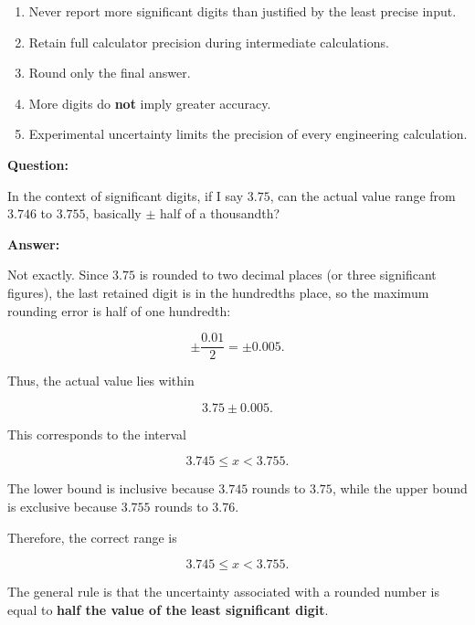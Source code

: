 \documentclass[12pt]{article}
\begin{document}
\begin{enumerate}
\item Never report more significant digits than justified by the least precise input.
\item Retain full calculator precision during intermediate calculations.
\item Round only the final answer.
\item More digits do \textbf{not} imply greater accuracy.
\item Experimental uncertainty limits the precision of every engineering calculation.
\end{enumerate}


\textbf{Question:}

In the context of significant digits, if I say \(3.75\), can the actual value range from \(3.746\) to \(3.755\), basically \(\pm\) half of a thousandth?

\bigskip

\textbf{Answer:}

Not exactly. Since \(3.75\) is rounded to two decimal places (or three significant figures), the last retained digit is in the hundredths place, so the maximum rounding error is half of one hundredth:

\[
\pm \frac{0.01}{2} = \pm 0.005.
\]

Thus, the actual value lies within

\[
3.75 \pm 0.005.
\]

This corresponds to the interval

\[
3.745 \le x < 3.755.
\]

The lower bound is inclusive because \(3.745\) rounds to \(3.75\), while the upper bound is exclusive because \(3.755\) rounds to \(3.76\).

Therefore, the correct range is

\[
\boxed{3.745 \le x < 3.755.}
\]

The general rule is that the uncertainty associated with a rounded number is equal to \textbf{half the value of the least significant digit}.
\end{document}
